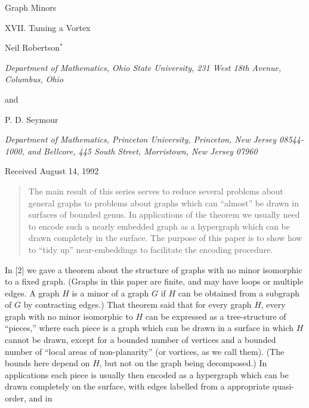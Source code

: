 {\centering
{\Large Graph Minors\par}
{\large XVII. Taming a Vortex\par}\medskip

Neil Robertson$^*$\par
\textit{Department of Mathematics, Ohio State University, 231 West 18th Avenue, Columbus, Ohio}\par
and\par
P. D. Seymour\par
\textit{Department of Mathematics, Princeton University, Princeton, New Jersey 08544-1000, and Bellcore, 445 South Street, Morristown, New Jersey 07960}\par
Received August 14, 1992\par
}
\begin{quote}
The main result of this series serves to reduce several problems about general graphs to problems about graphs which can ``almost'' be drawn in surfaces of bounded genus. In applications of the theorem we usually need to encode such a nearly embedded graph as a hypergraph which can be drawn completely in the surface. The purpose of this paper is to show how to ``tidy up'' near-embeddings to facilitate the encoding procedure.
\end{quote}


In [2] we gave a theorem about the structure of graphs with no minor isomorphic to a fixed graph. (Graphs in this paper are finite, and may have loops or multiple edges. A graph $H$ is a minor of a graph $G$ if $H$ can be obtained from a subgraph of $G$ by contracting edges.) That theorem said that for every graph $H$, every graph with no minor isomorphic to $H$ can be expressed as a tree-structure of ``pieces,'' where each piece is a graph which can be drawn in a surface in which $H$ cannot be drawn, except for a bounded number of vertices and a bounded number of ``local areas of non-planarity'' (or vortices, as we call them). (The bounds here depend on $H$, but not on the graph being decomposed.) In applications each piece is usually then encoded as a hypergraph which can be drawn completely on the surface, with edges labelled from a appropriate quasi-order, and in%
